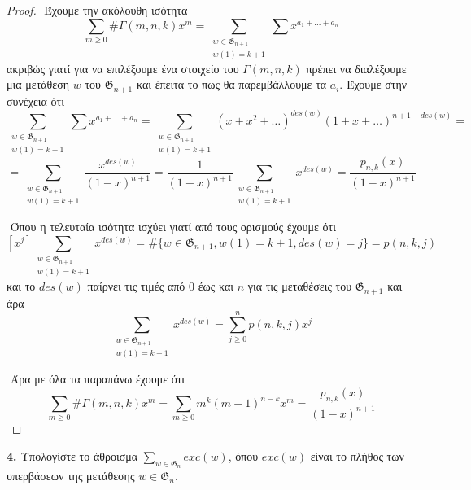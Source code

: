 \documentclass[oneside,a4paper]{article}
\begin{document}
\begin{proof}
	$ $\newline
	Έχουμε την ακόλουθη ισότητα $$\sum\limits_{m\geq 0}\#\Gamma(m,n,k) x^m = \sum\limits_{\substack{w \in \mathfrak{G}_{n+1} \\ w(1)=k+1}} \sum x^{a_1 + \ldots + a_n}$$ ακριβώς γιατί για να επιλέξουμε ένα στοιχείο του $\Gamma(m,n,k)$ πρέπει να διαλέξουμε μια μετάθεση $w$ του $\mathfrak{G}_{n+1}$ και έπειτα το πως θα παρεμβάλλουμε τα $a_i$. Έχουμε στην συνέχεια ότι $$\sum\limits_{\substack{w \in \mathfrak{G}_{n+1} \\ w(1)=k+1}} \sum x^{a_1 + \ldots + a_n} = \sum\limits_{\substack{w \in \mathfrak{G}_{n+1} \\ w(1)=k+1}} (x+x^2 + \ldots)^{des(w)}(1+x+\ldots)^{n+1-des(w)} = $$
	$$ = \sum\limits_{\substack{w \in \mathfrak{G}_{n+1} \\ w(1)=k+1}} \frac{x^{des(w)}}{(1-x)^{n+1}} = \frac{1}{(1-x)^{n+1}} \sum\limits_{\substack{w \in \mathfrak{G}_{n+1} \\ w(1)=k+1}} x^{des(w)} = \frac{p_{n,k}(x)}{(1-x)^{n+1}}$$

	$ $\newline
	Όπου η τελευταία ισότητα ισχύει γιατί από τους ορισμούς έχουμε ότι $$[x^j] \sum\limits_{\substack{w \in \mathfrak{G}_{n+1} \\ w(1)=k+1}} x^{des(w)} = \#\{w \in \mathfrak{G}_{n+1}, w(1)=k+1, des(w) = j\} = p(n,k,j)$$ και το $des(w)$ παίρνει τις τιμές από $0$ έως και $n$ για τις μεταθέσεις του $\mathfrak{G}_{n+1}$ και άρα $$\sum\limits_{\substack{w \in \mathfrak{G}_{n+1} \\ w(1)=k+1}} x^{des(w)} = \sum\limits_{j\geq 0}^n p(n,k,j)x^j$$

	$ $\newline
	Άρα με όλα τα παραπάνω έχουμε ότι $$\sum\limits_{m\geq 0} \# \Gamma(m,n,k) x^m = \sum\limits_{m\geq 0} m^k (m+1)^{n-k} x^m = \frac{p_{n,k}(x)}{(1-x)^{n+1}}$$
\end{proof}
\pagebreak


\noindent \textbf{4. } Υπολογίστε το άθροισμα $\sum\limits_{w \in \mathfrak{G}_n} exc(w)$, όπου $exc(w)$ είναι το πλήθος των υπερβάσεων της μετάθεσης $w \in \mathfrak{G}_n$.
\end{document}
